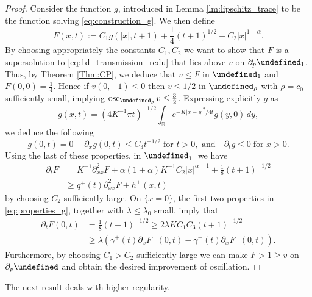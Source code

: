 \documentclass[12pt]{article}
\let\P\undefined
\numberwithin{Theorem}{section}
\theoremstyle{definition}
\theoremstyle{remark}
\numberwithin{equation}{section}
\newcommand{\p}{\partial}
\newcommand{\osc}{\operatorname{osc}}
\newcommand{\P}{\mathcal{P}}
\begin{document}
\begin{proof}
Consider the function $g$, introduced in Lemma \ref{lm:lipschitz_trace} to be the function solving \eqref{eq:construction_g}. We then define
    \[
    F(x,t):=C_1g(|x|,t+1)+ \frac{1}{4}(t+1)^{1/2}-C_2|x|^{1+{ \alpha}}.
    \]
     By choosing appropriately the constants $C_1,C_2$ we want to show that $F$ is a supersolution to \eqref{eq:1d_transmission_redu} that lies above $v$ on $\p_p \P_1$. Thus, by Theorem \ref{Thm:CP}, we deduce that $v \leq F$ in $\P_1$  and $F(0,0)=\frac{1}{4}$. Hence if $v(0,-1) \leq 0$ then $v \leq 1/2$ in $\P_\rho$ with $\rho=c_0$ sufficiently small, implying $\osc_{\P_\rho} v \leq \frac{3}{2}$. 
    Expressing  explicitly $g$ as
    \[
    g(x,t)=(4K^{-1}\pi t)^{-1/2} \int_{\mathbb{R}} e^{-K|x-y|^{2}/4t} g(y,0) \, dy,
    \]
    we deduce the following
    \begin{equation} \label{eq:properties_g}
    g(0,t)=0 \; \quad \p_x g(0,t)\leq C_3 t^{-1/2} \; \text{for }t>0, \text{ and}  \quad \p_t g \leq 0 \; \text{for }x>0.
    \end{equation}
    Using the last of these properties, in $\P_1^\pm$ we have
\begin{align*}
        \p_t F&=K^{-1} \p_{xx}^2 F+ { \alpha}(1+{ \alpha})K^{-1}C_2|x|^{{ \alpha}-1} + \frac{1}{8}(t+1)^{-1/2} \\
        &\geq q^{\pm}(t)  \p_{xx}^2 F + h^{\pm}(x,t)
    \end{align*}
   by choosing $C_2$ sufficiently large.
On $\{ x=0\}$, the first two properties in \eqref{eq:properties_g}, together with  $\lambda \leq \lambda_0$ small, imply that 
\begin{align*}
    \p_t F(0,t)&=\frac{1}{8}(t+1)^{-1/2} \geq 2 \lambda K C_1 C_3 (t+1)^{-1/2} \\
    &\geq \lambda \left( \gamma^{+}(t) \p_x F^+(0,t) - \gamma^{-}(t) \p_x F^-(0,t) \right).
\end{align*}
Furthermore, by choosing $C_1>C_2$ sufficiently large we can make $F>1\geq v$ on $\p_p \P$ and obtain the desired improvement of oscillation.  

\end{proof}

The next result deals with higher regularity.
\end{document}
